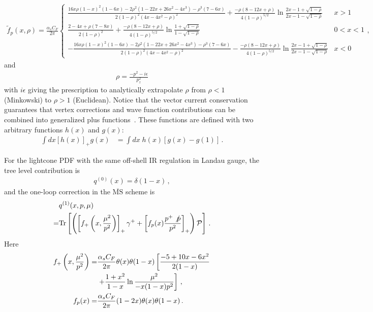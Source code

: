 \begin{align}
\widetilde{f}_p(x,\rho)=\frac{\alpha_s C_F}{2\pi}\left\{
\begin{array}{lc}
\frac{16x\rho(1-x)^2(1-6x)-2\rho^2(1-22x+26x^2-4x^3)-\rho^3(7-6x)}{2(1-\rho)^2(4x-4x^2-\rho)^2}+\frac{-\rho(8-12x+\rho)}{4(1-\rho)^{5/2}}\ln\frac{2x-1+\sqrt{1-\rho}}{2x-1-\sqrt{1-\rho}} & x>1\\
\frac{2-4x+\rho(7-8x)}{2(1-\rho)^2}+\frac{-\rho(8-12x+\rho)}{4(1-\rho)^{5/2}}\ln\frac{1+\sqrt{1-\rho}}{1-\sqrt{1-\rho}} & 0<x<1\\
-\frac{16x\rho(1-x)^2(1-6x)-2\rho^2(1-22x+26x^2-4x^3)-\rho^3(7-6x)}{2(1-\rho)^2(4x-4x^2-\rho)^2}-\frac{-\rho(8-12x+\rho)}{4(1-\rho)^{5/2}}\ln\frac{2x-1+\sqrt{1-\rho}}{2x-1-\sqrt{1-\rho}} & x<0
\end{array}\right.,
\end{align}
and
\begin{align}
\rho=\frac{-p^2-i\epsilon}{p_z^2}
\end{align}
with $i\epsilon$ giving the prescription to analytically extrapolate  $\rho$ from $\rho<1$ (Minkowski) to $\rho>1$ (Euclidean).  Notice that the vector current conservation guarantees  that  vertex corrections and  wave function contributions can  be combined  into    generalized plus functions~\cite{Stewart:2017tvs}. These functions are  defined with two arbitrary functions $h(x)$ and $g(x)$: 
\begin{align}
\int dx\left[{h(x)}\right]_+ g(x)&=\int dx\;h(x)\left[g(x)-g(1)\right]\,.
\end{align}

For the lightcone PDF with the same off-shell IR regulation in   Landau gauge, the tree level contribution is
\begin{align}
q^{(0)}(x)=\delta(1-x)\,,
\end{align}
and the   one-loop correction in the $\overline{\text{MS}}$ scheme is
\begin{align}\label{eq:one_loop_lightconePDF}
&q^{(1)}(x,p,\mu)\nonumber\\
=&\mbox{Tr}\left[\left(\left[f_+\left(x,\frac{\mu^2}{p^2}\right)\right]_+\gamma^++\left[f_p(x)\frac{p^+\not{p}}{p^2}\right]_+\right) {\cal P}\right]\,.
\end{align}
Here
\begin{align}
f_+\left(x,\frac{\mu^2}{p^2}\right)=&\frac{\alpha_s C_F}{2\pi}\theta(x)\theta(1-x)\left[
\frac{-5+10x-6x^2}{2(1-x)}\right.\nonumber\\
&\left.+\frac{1+x^2}{1-x}\ln\frac{\mu^2}{-x(1-x)p^2}\right]\,, \\
f_p(x)=&\frac{\alpha_s C_F}{2\pi}(1-2x)\theta(x)\theta(1-x)\,.
\end{align}

